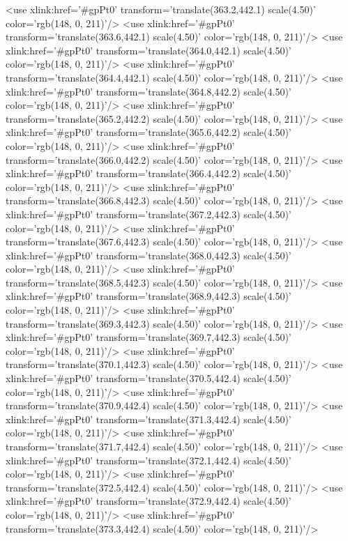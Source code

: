 	<use xlink:href='#gpPt0' transform='translate(363.2,442.1) scale(4.50)' color='rgb(148,   0, 211)'/>
	<use xlink:href='#gpPt0' transform='translate(363.6,442.1) scale(4.50)' color='rgb(148,   0, 211)'/>
	<use xlink:href='#gpPt0' transform='translate(364.0,442.1) scale(4.50)' color='rgb(148,   0, 211)'/>
	<use xlink:href='#gpPt0' transform='translate(364.4,442.1) scale(4.50)' color='rgb(148,   0, 211)'/>
	<use xlink:href='#gpPt0' transform='translate(364.8,442.2) scale(4.50)' color='rgb(148,   0, 211)'/>
	<use xlink:href='#gpPt0' transform='translate(365.2,442.2) scale(4.50)' color='rgb(148,   0, 211)'/>
	<use xlink:href='#gpPt0' transform='translate(365.6,442.2) scale(4.50)' color='rgb(148,   0, 211)'/>
	<use xlink:href='#gpPt0' transform='translate(366.0,442.2) scale(4.50)' color='rgb(148,   0, 211)'/>
	<use xlink:href='#gpPt0' transform='translate(366.4,442.2) scale(4.50)' color='rgb(148,   0, 211)'/>
	<use xlink:href='#gpPt0' transform='translate(366.8,442.3) scale(4.50)' color='rgb(148,   0, 211)'/>
	<use xlink:href='#gpPt0' transform='translate(367.2,442.3) scale(4.50)' color='rgb(148,   0, 211)'/>
	<use xlink:href='#gpPt0' transform='translate(367.6,442.3) scale(4.50)' color='rgb(148,   0, 211)'/>
	<use xlink:href='#gpPt0' transform='translate(368.0,442.3) scale(4.50)' color='rgb(148,   0, 211)'/>
	<use xlink:href='#gpPt0' transform='translate(368.5,442.3) scale(4.50)' color='rgb(148,   0, 211)'/>
	<use xlink:href='#gpPt0' transform='translate(368.9,442.3) scale(4.50)' color='rgb(148,   0, 211)'/>
	<use xlink:href='#gpPt0' transform='translate(369.3,442.3) scale(4.50)' color='rgb(148,   0, 211)'/>
	<use xlink:href='#gpPt0' transform='translate(369.7,442.3) scale(4.50)' color='rgb(148,   0, 211)'/>
	<use xlink:href='#gpPt0' transform='translate(370.1,442.3) scale(4.50)' color='rgb(148,   0, 211)'/>
	<use xlink:href='#gpPt0' transform='translate(370.5,442.4) scale(4.50)' color='rgb(148,   0, 211)'/>
	<use xlink:href='#gpPt0' transform='translate(370.9,442.4) scale(4.50)' color='rgb(148,   0, 211)'/>
	<use xlink:href='#gpPt0' transform='translate(371.3,442.4) scale(4.50)' color='rgb(148,   0, 211)'/>
	<use xlink:href='#gpPt0' transform='translate(371.7,442.4) scale(4.50)' color='rgb(148,   0, 211)'/>
	<use xlink:href='#gpPt0' transform='translate(372.1,442.4) scale(4.50)' color='rgb(148,   0, 211)'/>
	<use xlink:href='#gpPt0' transform='translate(372.5,442.4) scale(4.50)' color='rgb(148,   0, 211)'/>
	<use xlink:href='#gpPt0' transform='translate(372.9,442.4) scale(4.50)' color='rgb(148,   0, 211)'/>
	<use xlink:href='#gpPt0' transform='translate(373.3,442.4) scale(4.50)' color='rgb(148,   0, 211)'/>
